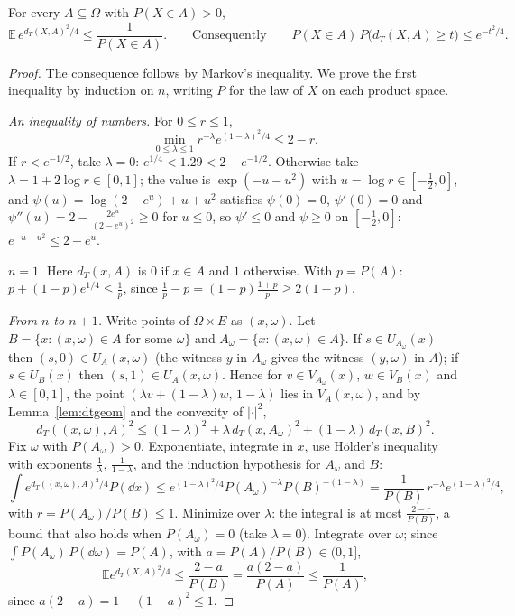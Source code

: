 \begin{theorem}\label{thm:talagrand}
For every $A\subseteq\Omega$ with $P(X\in A)>0$,
\[
\mathbb E\,e^{d_T(X,A)^2/4}\le\frac1{P(X\in A)}.\qquad\text{Consequently}\qquad P(X\in A)\,P\bigl(d_T(X,A)\ge t\bigr)\le e^{-t^2/4}.
\]
\end{theorem}
\begin{proof}
The consequence follows by Markov's inequality. We prove the first inequality by induction on $n$, writing $P$ for the law of $X$ on each product space.

\emph{An inequality of numbers.} For $0\le r\le1$,
\[
\min_{0\le\lambda\le1}r^{-\lambda}e^{(1-\lambda)^2/4}\le2-r.
\] If $r<e^{-1/2}$, take $\lambda=0$: $e^{1/4}<1.29<2-e^{-1/2}$. Otherwise take
$\lambda=1+2\log r\in[0,1]$; the value is $\exp(-u-u^2)$ with $u=\log r\in[-\frac12,0]$, and $\psi(u)=\log(2-e^u)+u+u^2$ satisfies $\psi(0)=0$, $\psi'(0)=0$ and
$\psi''(u)=2-\frac{2e^u}{(2-e^u)^2}\ge0$ for $u\le0$, so $\psi'\le0$ and $\psi\ge0$ on $[-\frac12,0]$: $e^{-u-u^2}\le2-e^u$.

\emph{$n=1$.} Here $d_T(x,A)$ is $0$ if $x\in A$ and $1$ otherwise. With $p=P(A)$: $p+(1-p)e^{1/4}\le\frac1p$, since $\frac1p-p=(1-p)\frac{1+p}p\ge2(1-p)$.

\emph{From $n$ to $n+1$.} Write points of $\Omega\times E$ as $(x,\omega)$. Let $B=\{x:(x,\omega)\in A\text{ for some }\omega\}$ and $A_\omega=\{x:(x,\omega)\in A\}$. If $s\in U_{A_\omega}(x)$ then $(s,0)\in U_A(x,\omega)$
(the witness $y$ in $A_\omega$ gives the witness $(y,\omega)$ in $A$); if $s\in U_B(x)$ then $(s,1)\in U_A(x,\omega)$. Hence for $v\in V_{A_\omega}(x)$, $w\in V_B(x)$ and $\lambda\in[0,1]$, the point
$(\lambda v+(1-\lambda)w,\,1-\lambda)$ lies in $V_A(x,\omega)$, and by Lemma~\ref{lem:dtgeom} and the convexity of $|\cdot|^2$,
\[
d_T((x,\omega),A)^2\le(1-\lambda)^2+\lambda\,d_T(x,A_\omega)^2+(1-\lambda)\,d_T(x,B)^2.
\]
Fix $\omega$ with $P(A_\omega)>0$. Exponentiate, integrate in $x$, use H\"older's inequality with exponents $\frac1\lambda$, $\frac1{1-\lambda}$, and the induction hypothesis for $A_\omega$ and $B$:
\[
\int e^{d_T((x,\omega),A)^2/4}P(\dd x)\le e^{(1-\lambda)^2/4}P(A_\omega)^{-\lambda}P(B)^{-(1-\lambda)}=\frac1{P(B)}\,r^{-\lambda}e^{(1-\lambda)^2/4},
\]
with $r=P(A_\omega)/P(B)\le1$. Minimize over $\lambda$: the integral is at most $\frac{2-r}{P(B)}$, a bound that also holds when $P(A_\omega)=0$ (take $\lambda=0$). Integrate over $\omega$; since
$\int P(A_\omega)\,P(\dd\omega)=P(A)$, with $a=P(A)/P(B)\in(0,1]$,
\[
\mathbb Ee^{d_T(X,A)^2/4}\le\frac{2-a}{P(B)}=\frac{a(2-a)}{P(A)}\le\frac1{P(A)} ,
\]
since $a(2-a)=1-(1-a)^2\le1$.
\end{proof}

